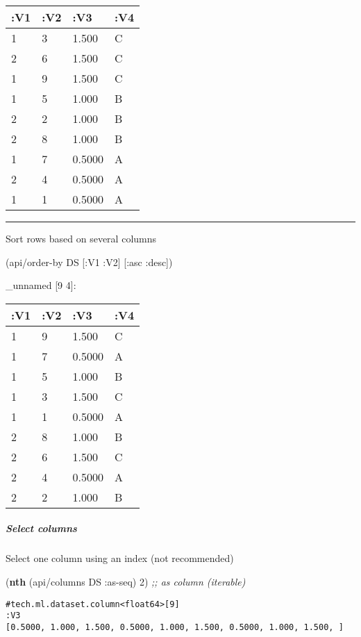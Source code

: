 \documentclass[]{article}
\newenvironment{Shaded}{\begin{snugshade}}{\end{snugshade}}
\newcommand{\KeywordTok}[1]{\textcolor[rgb]{0.13,0.29,0.53}{\textbf{#1}}}
\newcommand{\DecValTok}[1]{\textcolor[rgb]{0.00,0.00,0.81}{#1}}
\newcommand{\CommentTok}[1]{\textcolor[rgb]{0.56,0.35,0.01}{\textit{#1}}}
\newcommand{\AttributeTok}[1]{\textcolor[rgb]{0.77,0.63,0.00}{#1}}
\newcommand{\NormalTok}[1]{#1}
\let\oldsubparagraph\subparagraph
\renewcommand{\subparagraph}[1]{\oldsubparagraph{#1}\mbox{}}
\begin{document}
\begin{longtable}[]{@{}llll@{}}
\toprule
:V1 & :V2 & :V3 & :V4\tabularnewline
\midrule
\endhead
1 & 3 & 1.500 & C\tabularnewline
2 & 6 & 1.500 & C\tabularnewline
1 & 9 & 1.500 & C\tabularnewline
1 & 5 & 1.000 & B\tabularnewline
2 & 2 & 1.000 & B\tabularnewline
2 & 8 & 1.000 & B\tabularnewline
1 & 7 & 0.5000 & A\tabularnewline
2 & 4 & 0.5000 & A\tabularnewline
1 & 1 & 0.5000 & A\tabularnewline
\bottomrule
\end{longtable}

\begin{center}\rule{0.5\linewidth}{0.5pt}\end{center}

Sort rows based on several columns

\begin{Shaded}
\begin{Highlighting}[]
\NormalTok{(api/order-by DS [}\AttributeTok{:V1} \AttributeTok{:V2}\NormalTok{] [}\AttributeTok{:asc} \AttributeTok{:desc}\NormalTok{])}
\end{Highlighting}
\end{Shaded}

\_unnamed {[}9 4{]}:

\begin{longtable}[]{@{}llll@{}}
\toprule
:V1 & :V2 & :V3 & :V4\tabularnewline
\midrule
\endhead
1 & 9 & 1.500 & C\tabularnewline
1 & 7 & 0.5000 & A\tabularnewline
1 & 5 & 1.000 & B\tabularnewline
1 & 3 & 1.500 & C\tabularnewline
1 & 1 & 0.5000 & A\tabularnewline
2 & 8 & 1.000 & B\tabularnewline
2 & 6 & 1.500 & C\tabularnewline
2 & 4 & 0.5000 & A\tabularnewline
2 & 2 & 1.000 & B\tabularnewline
\bottomrule
\end{longtable}

\subparagraph{Select columns}\label{select-columns}

Select one column using an index (not recommended)

\begin{Shaded}
\begin{Highlighting}[]
\NormalTok{(}\KeywordTok{nth}\NormalTok{ (api/columns DS }\AttributeTok{:as-seq}\NormalTok{) }\DecValTok{2}\NormalTok{) }\CommentTok{;; as column (iterable)}
\end{Highlighting}
\end{Shaded}

\begin{verbatim}
#tech.ml.dataset.column<float64>[9]
:V3
[0.5000, 1.000, 1.500, 0.5000, 1.000, 1.500, 0.5000, 1.000, 1.500, ]
\end{verbatim}
\end{document}
